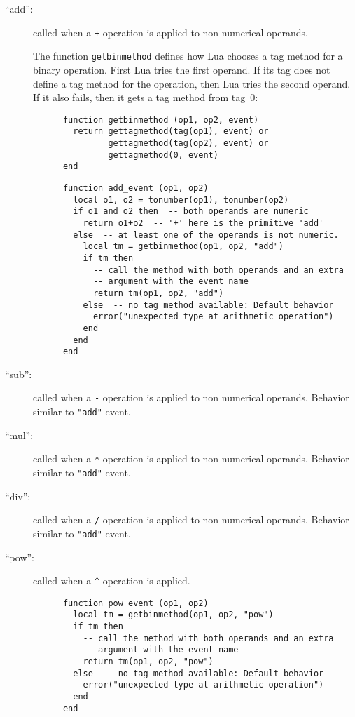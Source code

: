 \begin{description}

\item[``add'':]
called when a \verb|+| operation is applied to non numerical operands.

The function \verb|getbinmethod| defines how Lua chooses a tag method
for a binary operation.
First Lua tries the first operand.
If its tag does not define a tag method for the operation,
then Lua tries the second operand.
If it also fails, then it gets a tag method from tag~0:
\begin{verbatim}
      function getbinmethod (op1, op2, event)
        return gettagmethod(tag(op1), event) or
               gettagmethod(tag(op2), event) or
               gettagmethod(0, event)
      end
\end{verbatim}
\begin{verbatim}
      function add_event (op1, op2)
        local o1, o2 = tonumber(op1), tonumber(op2)
        if o1 and o2 then  -- both operands are numeric
          return o1+o2  -- '+' here is the primitive 'add'
        else  -- at least one of the operands is not numeric.
          local tm = getbinmethod(op1, op2, "add")
          if tm then
            -- call the method with both operands and an extra
            -- argument with the event name
            return tm(op1, op2, "add")
          else  -- no tag method available: Default behavior
            error("unexpected type at arithmetic operation")
          end
        end
      end
\end{verbatim}

\item[``sub'':]
called when a \verb|-| operation is applied to non numerical operands.
Behavior similar to \verb|"add"| event.

\item[``mul'':]
called when a \verb|*| operation is applied to non numerical operands.
Behavior similar to \verb|"add"| event.

\item[``div'':]
called when a \verb|/| operation is applied to non numerical operands.
Behavior similar to \verb|"add"| event.

\item[``pow'':]
called when a \verb|^| operation is applied.
\begin{verbatim}
      function pow_event (op1, op2)
        local tm = getbinmethod(op1, op2, "pow")
        if tm then
          -- call the method with both operands and an extra
          -- argument with the event name
          return tm(op1, op2, "pow")
        else  -- no tag method available: Default behavior
          error("unexpected type at arithmetic operation")
        end
      end
\end{verbatim}


\end{description}
